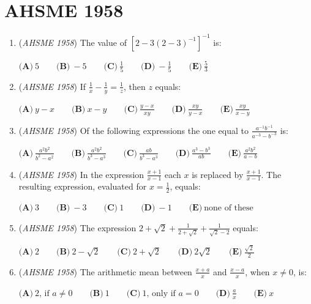 \section{AHSME 1958}
        \begin{enumerate}
        	\item (\textit{AHSME 1958}) The value of $[2 - 3(2 - 3)^{-1}]^{-1}$ is:


 $\textbf{(A)}\ 5\qquad  \textbf{(B)}\ -5\qquad  \textbf{(C)}\ \frac{1}{5}\qquad  \textbf{(D)}\ -\frac{1}{5}\qquad  \textbf{(E)}\ \frac{5}{3}$


	\item (\textit{AHSME 1958}) If $\frac {1}{x} - \frac {1}{y} = \frac {1}{z}$, then $z$ equals:


 $\textbf{(A)}\ y - x\qquad \textbf{(B)}\ x - y\qquad \textbf{(C)}\ \frac {y - x}{xy}\qquad \textbf{(D)}\ \frac {xy}{y - x}\qquad \textbf{(E)}\ \frac {xy}{x - y}$


	\item (\textit{AHSME 1958}) Of the following expressions the one equal to $\frac{a^{-1}b^{-1}}{a^{-3} - b^{-3}}$ is:


 $\textbf{(A)}\ \frac{a^2b^2}{b^2 - a^2}\qquad  \textbf{(B)}\ \frac{a^2b^2}{b^3 - a^3}\qquad  \textbf{(C)}\ \frac{ab}{b^3 - a^3}\qquad  \textbf{(D)}\ \frac{a^3 - b^3}{ab}\qquad  \textbf{(E)}\ \frac{a^2b^2}{a - b}$


	\item (\textit{AHSME 1958}) In the expression $\frac{x + 1}{x - 1}$ each $x$ is replaced by $\frac{x + 1}{x - 1}$. The resulting expression, evaluated for $x = \frac{1}{2}$, equals:


 $\textbf{(A)}\ 3\qquad  \textbf{(B)}\ -3\qquad  \textbf{(C)}\ 1\qquad  \textbf{(D)}\ -1\qquad  \textbf{(E)}\ \text{none of these}$


	\item (\textit{AHSME 1958}) The expression $2 + \sqrt{2} + \frac{1}{2 + \sqrt{2}} + \frac{1}{\sqrt{2} - 2}$  equals:


 $\textbf{(A)}\ 2\qquad  \textbf{(B)}\ 2 - \sqrt{2}\qquad  \textbf{(C)}\ 2 + \sqrt{2}\qquad  \textbf{(D)}\ 2\sqrt{2}\qquad  \textbf{(E)}\ \frac{\sqrt{2}}{2}$


	\item (\textit{AHSME 1958}) The arithmetic mean between $\frac {x + a}{x}$ and $\frac {x - a}{x}$, when $x \neq 0$, is:


 $\textbf{(A)}\ {2}\text{, if }{a \neq 0}\qquad \textbf{(B)}\ 1\qquad \textbf{(C)}\ {1}\text{, only if }{a = 0}\qquad \textbf{(D)}\ \frac {a}{x}\qquad \textbf{(E)}\ x$



\end{enumerate}
